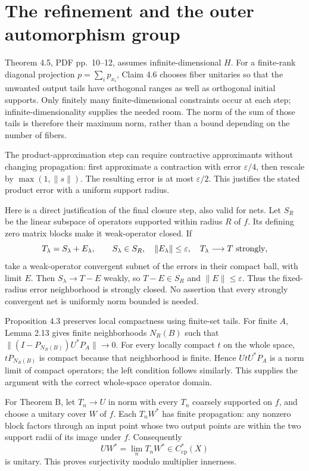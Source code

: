 \documentclass[10pt]{article}
\begin{document}
\section*{The refinement and the outer automorphism group}
Theorem 4.5, PDF pp. 10–12, assumes infinite-dimensional \(H\). For a finite-rank diagonal projection \(p=\sum_i p_{x_i}\), Claim 4.6 chooses fiber unitaries so that the unwanted output tails have orthogonal ranges as well as orthogonal initial supports. Only finitely many finite-dimensional constraints occur at each step; infinite-dimensionality supplies the needed room. The norm of the sum of those tails is therefore their maximum norm, rather than a bound depending on the number of fibers.\par
The product-approximation step can require contractive approximants without changing propagation: first approximate a contraction with error \(\varepsilon/4\), then rescale by \(\max(1,\|s\|)\). The resulting error is at most \(\varepsilon/2\). This justifies the stated product error with a uniform support radius.\par
Here is a direct justification of the final closure step, also valid for nets. Let \(S_R\) be the linear subspace of operators supported within radius \(R\) of \(f\). Its defining zero matrix blocks make it weak-operator closed. If \[T_\lambda=S_\lambda+E_\lambda,\qquad
 S_\lambda\in S_R,\quad \|E_\lambda\|\le\varepsilon,\quad
 T_\lambda\longrightarrow T\ \hbox{strongly},\] take a weak-operator convergent subnet of the errors in their compact ball, with limit \(E\). Then \(S_\lambda\to T-E\) weakly, so \(T-E\in S_R\) and \(\|E\|\le\varepsilon\). Thus the fixed-radius error neighborhood is strongly closed. No assertion that every strongly convergent net is uniformly norm bounded is needed.\par
Proposition 4.3 preserves local compactness using finite-set tails. For finite \(A\), Lemma 2.13 gives finite neighborhoods \(N_R(B)\) such that \(\|(I-P_{N_R(B)})U^*P_A\|\to0\). For every locally compact \(t\) on the whole space, \(tP_{N_R(B)}\) is compact because that neighborhood is finite. Hence \(UtU^*P_A\) is a norm limit of compact operators; the left condition follows similarly. This supplies the argument with the correct whole-space operator domain.\par
For Theorem B, let \(T_n\to U\) in norm with every \(T_n\) coarsely supported on \(f\), and choose a unitary cover \(W\) of \(f\). Each \(T_nW^*\) has finite propagation: any nonzero block factors through an input point whose two output points are within the two support radii of its image under \(f\). Consequently \[UW^*=\lim_nT_nW^*\in C^*_{\mathrm{cp}}(X)\] is unitary. This proves surjectivity modulo multiplier innerness.\par
\end{document}
